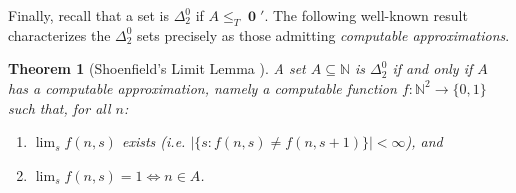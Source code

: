 \documentclass[10pt,A4]{amsart}
\newtheorem{thm}{Theorem}[section]
\theoremstyle{definition}
\theoremstyle{definition}
\newcommand{\N}{\mathbb{N}}
\newcommand{\HP}{\operatorname{\mathbf{0}} '}
\begin{document}




Finally, recall that a set is $\Delta_2^0$ if $A \le_T \HP$.
The following well-known result characterizes the $\Delta_2^0$ sets precisely as those admitting \emph{computable approximations}.
\begin{thm}[Shoenfield's Limit Lemma \cite{limit-lemma}]\label{shoenfield}
    A set $A \subseteq \N$ is $\Delta_2^0$ if and only if $A$ has a \emph{computable approximation}, namely a computable function $f \colon \N^2 \to \{0, 1 \}$ such that, for all $n$:
    \begin{enumerate}
        \item $\lim_{s} f(n,s)$ exists (i.e. $|\{s:f(n,s) \ne f(n,s+1)\}| < \infty$), and
        \item $\lim_{s} f(n,s) = 1 \iff n \in A$.
    \end{enumerate}
\end{thm}
\end{document}
